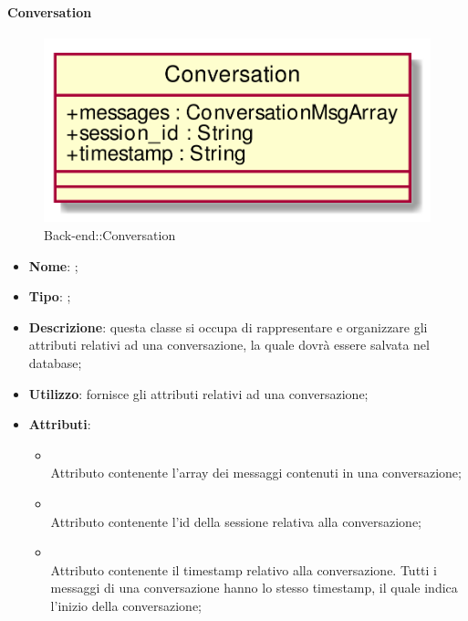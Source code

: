 \hypertarget{Conversation_label}{\paragraph{Conversation}}
\begin{figure}[h]
	\centering
	\includegraphics[width=\textwidth,height=\textheight,keepaspectratio]{images/ClassConversation.png}
	\caption{Back-end::Conversation}
\end{figure}
\begin{itemize}
	\item \textbf{Nome}: ;
	\item \textbf{Tipo}: ;
	\item \textbf{Descrizione}: questa classe si occupa di rappresentare e organizzare gli attributi relativi ad una conversazione, la quale dovrà essere salvata nel database;
	\item \textbf{Utilizzo}: fornisce gli attributi relativi ad una conversazione;
	\item \textbf{Attributi}:
	\begin{itemize}
		\item[]  \\
		Attributo contenente l'array dei messaggi contenuti in una conversazione;
		\item[]  \\
		Attributo contenente l'id della sessione relativa alla conversazione;
		\item[]  \\
		Attributo contenente il timestamp relativo alla conversazione. Tutti i messaggi di una conversazione  hanno lo stesso timestamp, il quale indica l'inizio della conversazione;
	\end{itemize}
\end{itemize}
\FloatBarrier

